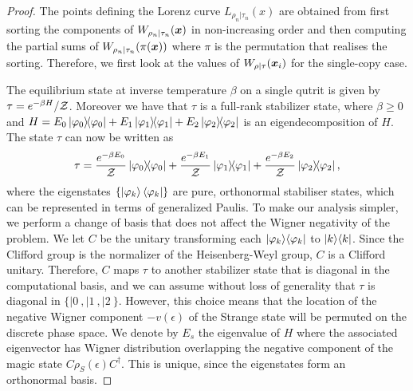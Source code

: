 \begin{proof}
The points defining the Lorenz curve $L_{\rho_n |\tau_n}(x)$ are obtained from first sorting the components of $W_{\rho_n |\tau_n}(\boldsymbol{x})$ in non-increasing order and then computing the partial sums of $W_{\rho_n |\tau_n}(\pi(\boldsymbol{x}))$ where $\pi$ is the permutation that realises the sorting. Therefore, we first look at the values of $W_{\rho|\tau}(\boldsymbol{x}_i)$ for the single-copy case.

The equilibrium state at inverse temperature $\beta$ on a single qutrit is given by $\tau = e^{-\beta H} / \mathcal{Z}$. Moreover we have that $\tau$ is a full-rank stabilizer state, where $\beta \geq 0$ and $H = E_0 \ketbra{\varphi_0} + E_1 \ketbra{\varphi_1} + E_2 \ketbra{\varphi_2}$ is an eigendecomposition of $H$.
The state $\tau$ can now be written as 
\begin{equation}
	\tau = \frac{e^{-\beta E_0}}{\mathcal{Z}} \ketbra{\varphi_0} + \frac{e^{-\beta E_1}}{\mathcal{Z}} \ketbra{\varphi_1} + \frac{e^{-\beta E_2}}{\mathcal{Z}} \ketbra{\varphi_2},
\end{equation}
where the eigenstates $\{\ket{\varphi_k}\langle\varphi_k|\}$ are pure, orthonormal stabiliser states, which can be represented in terms of generalized Paulis. To make our analysis simpler, we perform a change of basis that does not affect the Wigner negativity of the problem. We let $C$ be the unitary transforming each $|\varphi_k\rangle\langle\varphi_k|$ to $|k\rangle\langle k|$. Since the Clifford group is the normalizer of the Heisenberg-Weyl group, $C$ is a Clifford unitary. Therefore, $C$ maps $\tau$ to another stabilizer state that is diagonal in the computational basis, and we can assume without loss of generality that $\tau$ is diagonal in $\{|0\>,|1\>, |2\>\}$. However, this choice means that the location of the negative Wigner component $-v(\epsilon)$ of the Strange state will be permuted on the discrete phase space. We denote by $E_s$ the eigenvalue of $H$ where the associated eigenvector has Wigner distribution overlapping the negative component of the magic state $C\rho_S(\epsilon)C^\dagger$.  This is unique, since the eigenstates form an orthonormal basis.


\end{proof}
